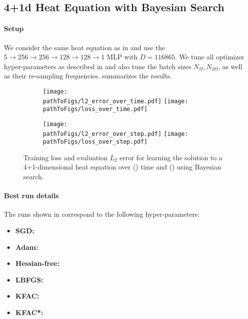 \subsection{4+1d Heat Equation with Bayesian Search}\label{sec:4d-heat-bayes-app}

\paragraph{Setup} We consider the same heat equation as in  and use the $5 \to 256 \to 256\to 128 \to 128 \to 1$ MLP with $D=\num{116865}$.
We tune all optimizer hyper-parameters as described in  and also tune the batch sizes $N_{\Omega}, N_{\partial \Omega}$, as well as their re-sampling frequencies.
 summarizes the results.

\begin{figure}[!h]
  \centering
  \def\pathToFigs{kfac_pinns_exp/exp31_heat4d_mlp_tanh_256_bayes}
  \begin{subfigure}[t]{1.0\linewidth}
    \caption{}\label{subfig:heat4d-bayes-time}
    \texttt{[image: \\pathToFigs/l2\_error\_over\_time.pdf]}
    \texttt{[image: \\pathToFigs/loss\_over\_time.pdf]}
  \end{subfigure}
  \begin{subfigure}[t]{1.0\linewidth}
    \caption{}\label{subfig:heat4d-bayes-step}
    \texttt{[image: \\pathToFigs/l2\_error\_over\_step.pdf]}
    \texttt{[image: \\pathToFigs/loss\_over\_step.pdf]}
  \end{subfigure}
  \caption{Training loss and evaluation $L_2$ error for learning the solution to a 4+1-dimensional heat equation over () time and () using Bayesian search.}\label{fig:heat4d-bayes-appendix}
\end{figure}

\paragraph{Best run details}
The runs shown in  correspond to the following hyper-parameters:
\begin{itemize}
  \def\pathToRuns{kfac_pinns_exp/exp31_heat4d_mlp_tanh_256_bayes/tex/}
\item \textbf{SGD:} 
\item \textbf{Adam:} 
\item \textbf{Hessian-free:} 
\item \textbf{LBFGS:} 
\item \textbf{KFAC:} 
\item \textbf{KFAC*:} 
\end{itemize}

